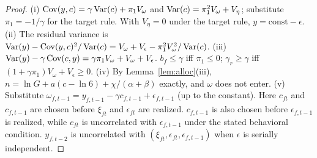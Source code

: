 \begin{proof}
(i) $\operatorname{Cov}(y,c)=\gamma\operatorname{Var}(c)+\pi_1V_\omega$ and $\operatorname{Var}(c)=\pi_1^2V_\omega+V_\eta$; substitute $\pi_1=-1/\gamma$ for the
target rule. With $V_\eta=0$ under the target rule, $y=\text{const}-\epsilon$. (ii) The residual variance is
$\operatorname{Var}(y)-\operatorname{Cov}(y,c)^2/\operatorname{Var}(c)=V_\omega+V_\epsilon-\pi_1^2V_\omega^2/\operatorname{Var}(c)$. (iii) $\operatorname{Var}(y)-\gamma\operatorname{Cov}(c,y)=\gamma\pi_1V_\omega+V_\omega+V_\epsilon$.
$b_f\le\gamma$ iff $\pi_1\le0$; $\gamma_r\ge\gamma$ iff $(1+\gamma\pi_1)V_\omega+V_\epsilon\ge0$. (iv) By
Lemma~\ref{lem:alloc}(iii), $n=\ln G+a(c-\ln6)+\chi/(\alpha+\beta)$ exactly, and $\omega$ does not enter. (v) Substitute
$\omega_{f,t-1}=y_{f,t-1}-\gamma c_{f,t-1}+\epsilon_{f,t-1}$ (up to the constant). Here $c_{ft}$ and $c_{f,t-1}$ are chosen
before $\xi_{ft}$ and $\epsilon_{ft}$ are realized. $c_{f,t-1}$ is also chosen before $\epsilon_{f,t-1}$ is realized, while $c_{ft}$ is
uncorrelated with $\epsilon_{f,t-1}$ under the stated behavioral condition. $y_{f,t-2}$ is uncorrelated with
$(\xi_{ft},\epsilon_{ft},\epsilon_{f,t-1})$ when $\epsilon$ is serially independent.
\end{proof}

